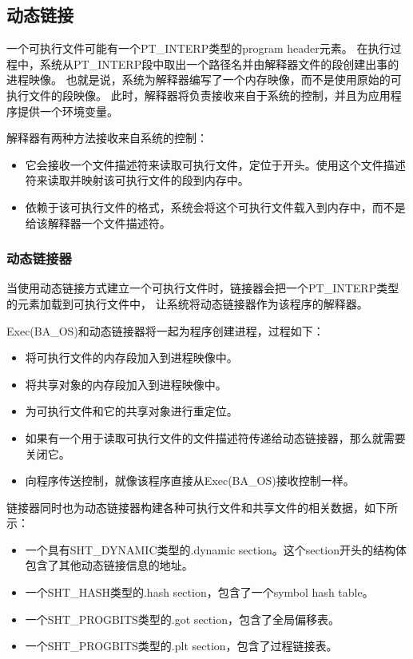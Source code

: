 \documentclass[a4paper,left=2.5cm,right=2.5cm,11pt]{article}
\begin{document}
\subsection{动态链接}
	一个可执行文件可能有一个PT\_INTERP类型的program header元素。
	在执行过程中，系统从PT\_INTERP段中取出一个路径名并由解释器文件的段创建出事的进程映像。
	也就是说，系统为解释器编写了一个内存映像，而不是使用原始的可执行文件的段映像。
	此时，解释器将负责接收来自于系统的控制，并且为应用程序提供一个环境变量。\par
	解释器有两种方法接收来自系统的控制：
	\begin{itemize}
		\item 它会接收一个文件描述符来读取可执行文件，定位于开头。使用这个文件描述符来读取并映射该可执行文件的段到内存中。
		\item 依赖于该可执行文件的格式，系统会将这个可执行文件载入到内存中，而不是给该解释器一个文件描述符。
	\end{itemize}

\subsubsection{动态链接器}
	当使用动态链接方式建立一个可执行文件时，链接器会把一个PT\_INTERP类型的元素加载到可执行文件中，
	让系统将动态链接器作为该程序的解释器。\par
	Exec(BA\_OS)和动态链接器将一起为程序创建进程，过程如下：
	\begin{itemize}
		\item 将可执行文件的内存段加入到进程映像中。
		\item 将共享对象的内存段加入到进程映像中。
		\item 为可执行文件和它的共享对象进行重定位。
		\item 如果有一个用于读取可执行文件的文件描述符传递给动态链接器，那么就需要关闭它。
		\item 向程序传送控制，就像该程序直接从Exec(BA\_OS)接收控制一样。
	\end{itemize}

	链接器同时也为动态链接器构建各种可执行文件和共享文件的相关数据，如下所示：
	\begin{itemize}
		\item 一个具有SHT\_DYNAMIC类型的.dynamic section。这个section开头的结构体包含了其他动态链接信息的地址。
		\item 一个SHT\_HASH类型的.hash section，包含了一个symbol hash table。
		\item 一个SHT\_PROGBITS类型的.got section，包含了全局偏移表。
		\item 一个SHT\_PROGBITS类型的.plt section，包含了过程链接表。
	\end{itemize}
\end{document}
